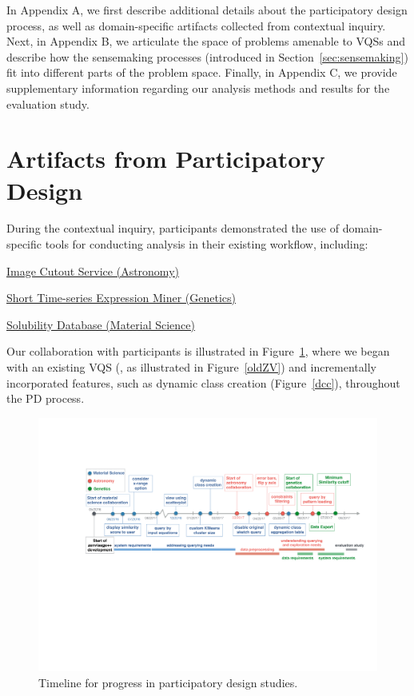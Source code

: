  \appendix
 \npar In Appendix A, we first describe additional details about the participatory design process, as well as domain-specific artifacts collected from contextual inquiry. Next, in Appendix B, we articulate the space of problems amenable to VQSs and describe how the sensemaking processes (introduced in Section~\ref{sec:sensemaking}) fit into different parts of the problem space. Finally, in Appendix C, we provide supplementary information regarding our analysis methods and results for the evaluation study.
 \section{Artifacts from Participatory Design\label{apdx:pdartifact}}
 \npar During the contextual inquiry, participants demonstrated the use of domain-specific tools for conducting analysis in their existing workflow, including:
   \begin{denselist}
     \item \href{http://descut.cosmology.illinois.edu}{Image Cutout Service (Astronomy)}
     \item \href{http://cs.cmu.edu/~jernst/stem/}{Short Time-series Expression Miner (Genetics)}
     \item \href{http://srdata.nist.gov/solubility/}{Solubility Database (Material Science)}
   \end{denselist}
 \npar Our collaboration with participants is illustrated in Figure~\ref{timeline}, where we began with an existing VQS (\zv, as illustrated in Figure~\ref{oldZV}) and incrementally incorporated features, such as dynamic class creation (Figure~\ref{dcc}), throughout the PD process.
 \begin{figure}[h!]
 	\centering
   \includegraphics[width=\linewidth]{figures/timeline.pdf}
 	\caption{Timeline for progress in participatory design studies.}
 	\label{timeline}
 \end{figure}
